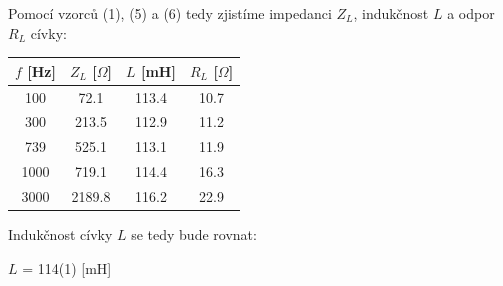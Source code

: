 \documentclass[a4paper,11pt]{article}
\begin{document}
\begin{minipage}[t]{0.5\textwidth} 
                Pomocí vzorců (1), (5) a (6) tedy zjistíme impedanci $Z_L$, indukčnost $L$ a odpor $R_L$ cívky:
                \vspace{10pt}
                \par \centering
                \begin{tabular}{|c|c|c|c|}
                    \hline
                    $f$ [Hz] & $Z_L$ [$\Omega$] & $L$ [mH] & $R_L$ [$\Omega$] \\
                    \hline
                    100 & 72.1 & 113.4 & 10.7 \\
                    \hline
                    300 & 213.5 & 112.9 & 11.2 \\
                    \hline
                    739 & 525.1 & 113.1 & 11.9 \\
                    \hline
                    1000 & 719.1 & 114.4 & 16.3 \\
                    \hline
                    3000 & 2189.8 & 116.2 & 22.9 \\
                    \hline
                \end{tabular}
                \captionsetup{justification=centering, font=footnotesize}
                \vspace{20pt}
                \raggedright
                \par Indukčnost cívky $L$ se tedy bude rovnat:
                \begin{center}
                    $L$ = 114(1) [mH]
                \end{center}
                \vspace{10pt}

\end{minipage}
\end{document}
